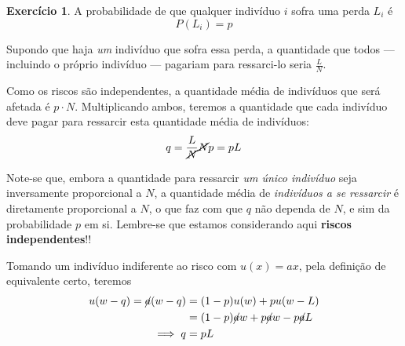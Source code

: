 \documentclass[12pt]{article}
\numberwithin{equation}{section}
\theoremstyle{plain}
\theoremstyle{definition}
\newtheorem{exercise}{Exercício}[section]
\theoremstyle{remark}
\begin{document}
\begin{exercise}
A probabilidade de que qualquer indivíduo \(i\) sofra uma perda
\(L_{i}\) é
\[
P(L_{i}) = p
\]

Supondo que haja \textit{um} indivíduo que sofra essa perda, a
quantidade que todos --- incluindo o próprio indivíduo --- pagariam para
ressarci-lo seria \(\frac{L}{N}\).

Como os riscos são independentes, a quantidade média de indivíduos que
será afetada é \(p\cdot N\). Multiplicando ambos, teremos a quantidade
que cada indivíduo deve pagar para ressarcir esta quantidade média de
indivíduos:
\[
q=\frac{L}{\cancel{ N }} \cancel{ N } p = pL
\]

Note-se que, embora a quantidade para ressarcir \textit{um único
indivíduo} seja inversamente proporcional a \(N\), a quantidade média de
\textit{indivíduos a se ressarcir} é diretamente proporcional a \(N\), o
que faz com que \(q\) não dependa de \(N\), e sim da probabilidade \(p\)
em si. Lembre-se que estamos considerando aqui \textbf{riscos
independentes}!!

Tomando um indivíduo indiferente ao risco com \(u(x)=ax\), pela
definição de equivalente certo, teremos \begin{align*}
u(w-q) = \cancel{ a }(w-q) &= (1-p)u(w) + p u(w-L) \\
&= (1-p) \cancel{ a }w + p \cancel{ a }w - p \cancel{ a }L \\
\implies q &= pL
\end{align*}
\end{exercise}
\end{document}
